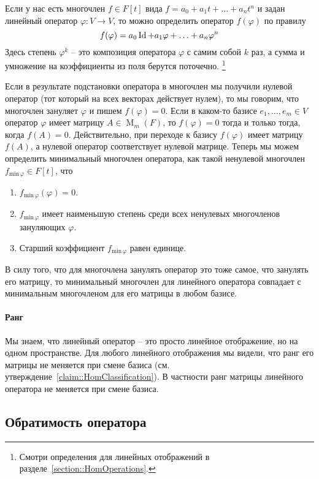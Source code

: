 Если у нас есть многочлен $f\in F[t]$ вида $f = a_0 + a_1 t + \ldots + a_nt^n$ и задан линейный оператор $\varphi \colon V\to V$, то можно определить оператор $f(\varphi)$ по правилу
\[
f(\varphi) = a_0 \operatorname{Id} + a_1 \varphi + \ldots + a_n \varphi^n
\]
Здесь степень $\varphi^k$ -- это композиция оператора $\varphi$ с самим собой $k$ раз, а сумма и умножение на коэффициенты из поля берутся поточечно.%
\footnote{Смотри определения для линейных отображений в разделе~\ref{section::HomOperations}.}

Если в результате подстановки оператора в многочлен мы получили нулевой оператор (тот который на всех векторах действует нулем), то мы говорим, что многочлен зануляет $\varphi$ и пишем $f(\varphi) = 0$.
Если в каком-то базисе $e_1,\ldots,e_m\in V$ оператор $\varphi$ имеет матрицу $A\in \operatorname{M}_{m}(F)$, то $f(\varphi) = 0$ тогда и только тогда, когда $f(A) = 0$.
Действительно, при переходе к базису $f(\varphi)$ имеет матрицу $f(A)$, а нулевой оператор соответствует нулевой матрице.
Теперь мы можем определить минимальный многочлен оператора, как такой ненулевой многочлен $f_{\text{min}\,\varphi}\in F[t]$, что
\begin{enumerate}
\item $f_{\text{min}\,\varphi}(\varphi) = 0$.

\item $f_{\text{min}\,\varphi}$ имеет наименьшую степень среди всех ненулевых многочленов зануляющих $\varphi$.

\item Старший коэффициент $f_{\text{min}\,\varphi}$ равен единице.
\end{enumerate}
В силу того, что для многочлена занулять оператор это тоже самое, что занулять его матрицу, то минимальный многочлен для линейного оператора совпадает с минимальным многочленом для его матрицы в любом базисе.

\paragraph{Ранг}

Мы знаем, что линейный оператор -- это просто линейное отображение, но на одном пространстве.
Для любого линейного отображения мы видели, что ранг его матрицы не меняется при смене базиса (см. утверждение~\ref{claim::HomClassification}).
В частности ранг матрицы линейного оператора не меняется при смене базиса.

\subsection{Обратимость оператора}

